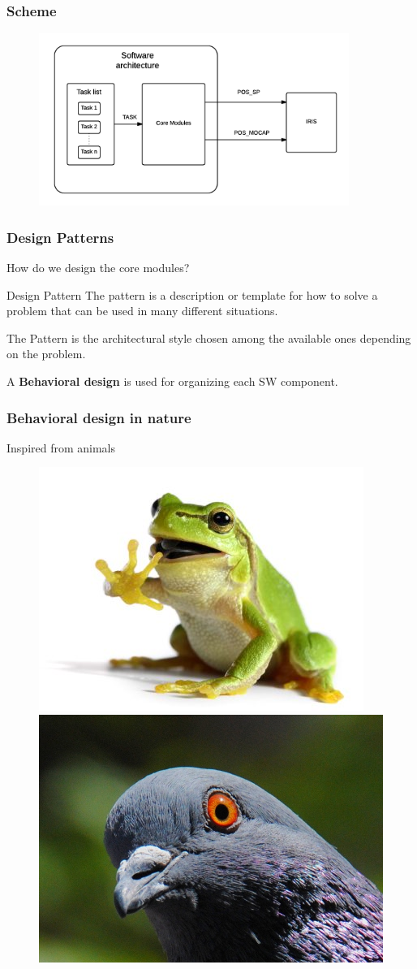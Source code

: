 \documentclass[xcolor=dvipsnames]{beamer}
\begin{document}
\begin{frame}
\frametitle{Scheme}
\begin{figure}
\centering
\includegraphics[width = 0.9\textwidth]{f/nested_arch.png}
\end{figure}
\end{frame}

\begin{frame}[t]
\frametitle{Design Patterns}
How do we design the core modules?
\vspace{3em}
\begin{block}{Design Pattern}
The pattern is a description or template for how to solve a problem that can be used in many different situations.
\end{block}
The Pattern is the architectural style chosen among the available ones depending on the problem. 

\vspace{2em}
A \textbf{Behavioral design} is used for organizing each SW component.

\end{frame}

\begin{frame}[t]
\frametitle{Behavioral design in nature}
Inspired from animals

\begin{figure}
\centering
\includegraphics[width =0.4 \textwidth]{f/frog.jpg}
\includegraphics[width =0.4 \textwidth]{f/pigeot.jpg}
\end{figure}
\begin{columns}

\end{columns}

\end{frame}
\end{document}

